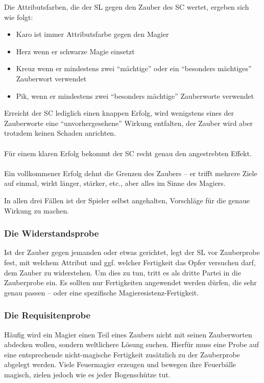 Die Attributsfarben, die der SL gegen den Zauber des SC wertet, ergeben sich wie folgt:
\begin{itemize}
\item Karo ist immer Attributsfarbe gegen den Magier
\item Herz wenn er schwarze Magie einsetzt
\item Kreuz wenn er mindestens zwei "`mächtige"' oder ein "`besonders mächtiges"' Zauberwort verwendet
\item Pik, wenn er mindestens zwei "`besonders mächtige"' Zauberworte verwendet
\end{itemize}
Erreicht der SC lediglich einen knappen Erfolg, wird wenigstens eines der Zauberworte eine "`unvorhergesehene"' Wirkung entfalten, der Zauber wird aber trotzdem keinen Schaden anrichten.\\
\\
Für einem klaren Erfolg bekommt der SC recht genau den angestrebten Effekt.\\
\\
Ein vollkommener Erfolg dehnt die Grenzen des Zaubers -- er trifft mehrere Ziele auf einmal, wirkt länger, stärker, etc., aber alles im Sinne des Magiers. 

In allen drei Fällen ist der Spieler selbst angehalten, Vorschläge für die genaue Wirkung zu machen.

\subsubsection{Die Widerstandsprobe}

Ist der Zauber gegen jemanden oder etwas gerichtet, legt der SL vor Zauberprobe fest, mit welchem Attribut und ggf. welcher Fertigkeit das Opfer versuchen darf, dem Zauber zu widerstehen. Um dies zu tun, tritt es als dritte Partei in die Zauberprobe ein.
Es sollten nur Fertigkeiten angewendet werden dürfen, die sehr genau passen -- oder eine spezifische Magieresistenz-Fertigkeit.

\subsubsection{Die Requisitenprobe}

Häufig wird ein Magier einen Teil eines Zaubers nicht mit seinen Zauberworten abdecken wollen, sondern weltlichere Lösung suchen. Hierfür muss eine Probe auf eine entsprechende nicht-magische Fertigkeit zusätzlich zu der Zauberprobe abgelegt werden. Viele Feuermagier erzeugen und bewegen ihre Feuerbälle magisch, zielen jedoch wie es jeder Bogenschütze tut.

